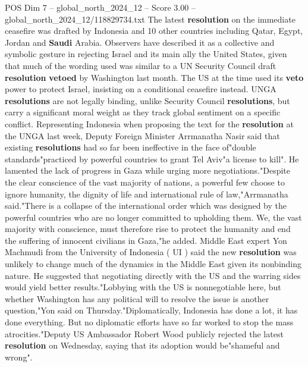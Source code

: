 \begin{textsample}{POS Dim 7 – global\_north\_2024\_12 – Score 3.00 – global\_north\_2024\_12/118829734.txt}
The latest \textbf{resolution} on the immediate ceasefire was drafted by Indonesia and 10 other countries including Qatar, Egypt, Jordan and \textbf{Saudi} Arabia.
Observers have described it as a collective and symbolic gesture in rejecting Israel and its main ally the United States, given that much of the wording used was similar to a UN Security Council draft \textbf{resolution} \textbf{vetoed} by Washington last month.
The US at the time used its \textbf{veto} power to protect Israel, insisting on a conditional ceasefire instead.
UNGA \textbf{resolutions} are not legally binding, unlike Security Council \textbf{resolutions}, but carry a significant moral weight as they track global sentiment on a specific conflict.
Representing Indonesia when proposing the text for the \textbf{resolution} at the UNGA last week, Deputy Foreign Minister Arrmanatha Nasir said that existing \textbf{resolutions} had so far been ineffective in the face of"double standards"practiced by powerful countries to grant Tel Aviv"a license to kill".
He lamented the lack of progress in Gaza while urging more negotiations."Despite the clear conscience of the vast majority of nations, a powerful few choose to ignore humanity, the dignity of life and international rule of law,"Arrmanatha said."There is a collapse of the international order which was designed by the powerful countries who are no longer committed to upholding them.
We, the vast majority with conscience, must therefore rise to protect the humanity and end the suffering of innocent civilians in Gaza,"he added.
Middle East expert Yon Machmudi from the University of Indonesia ( UI ) said the new \textbf{resolution} was unlikely to change much of the dynamics in the Middle East given its nonbinding nature.
He suggested that negotiating directly with the US and the warring sides would yield better results."Lobbying with the US is nonnegotiable here, but whether Washington has any political will to resolve the issue is another question,"Yon said on Thursday."Diplomatically, Indonesia has done a lot, it has done everything.
But no diplomatic efforts have so far worked to stop the mass atrocities."Deputy US Ambassador Robert Wood publicly rejected the latest \textbf{resolution} on Wednesday, saying that its adoption would be"shameful and wrong".

\end{textsample}
